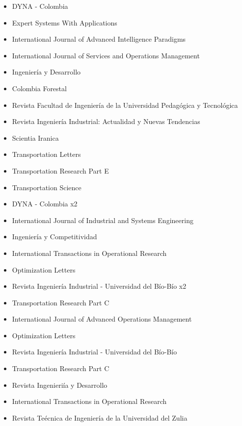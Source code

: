 {\begin{itemize}
\item DYNA - Colombia
\item Expert Systems With Applications
\item International Journal of Advanced Intelligence Paradigms 
\item International Journal of Services and Operations Management
\item Ingenier\'ia y Desarrollo 
\item Colombia Forestal
\item Revista Facultad de Ingenier\'ia de la Universidad Pedag\'ogica y Tecnol\'ogica
\item Revista Ingenier\'ia Industrial: Actualidad y Nuevas Tendencias
\item Scientia Iranica
\item Transportation Letters
\item Transportation Research Part E
\item Transportation Science
\end{itemize}
}

{\begin{itemize}
\item DYNA - Colombia x2
\item International Journal of Industrial and Systems Engineering
\item Ingenier\'ia y Competitividad
\item International Transactions in Operational Research
\item Optimization Letters
\item Revista Ingenier\'ia Industrial - Universidad del B\'io-B\'io x2
\item Transportation Research Part C
\end{itemize}
}

{\begin{itemize}
\item International Journal of Advanced Operations Management
\item Optimization Letters
\item Revista Ingenier\'ia Industrial - Universidad del B\'io-B\'io
\item Transportation Research Part C
\end{itemize}
}

{\begin{itemize}
\item Revista Ingenieri\'ia y Desarrollo
\item International Transactions in Operational Research
\item Revista Te\'ecnica de Ingenier\'ia de la Universidad del Zulia
\end{itemize}
}


